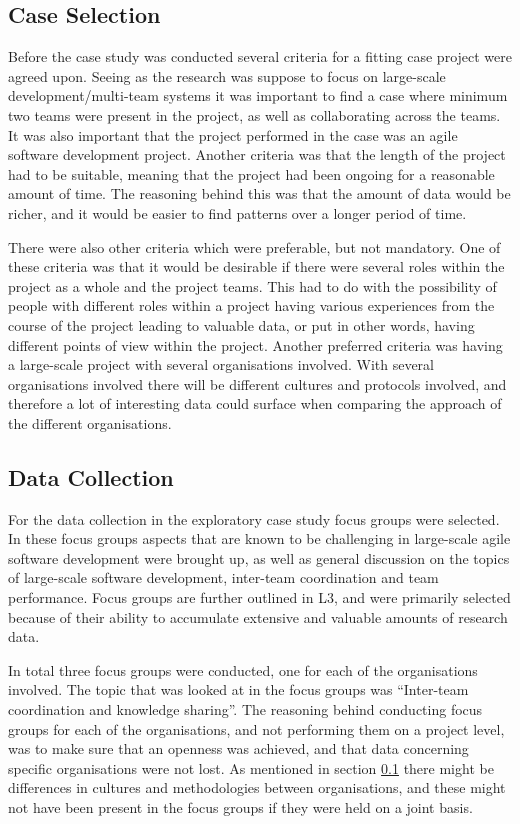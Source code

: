 \subsection{Case Selection}
\label{case_selection}

Before the case study was conducted several criteria for a fitting case project were agreed upon. Seeing as the research was suppose to focus on large-scale development/multi-team systems it was important to find a case where minimum two teams were present in the project, as well as collaborating across the teams. It was also important that the project performed in the case was an agile software development project. Another criteria was that the length of the project had to be suitable, meaning that the project had been ongoing for a reasonable amount of time. The reasoning behind this was that the amount of data would be richer, and it would be easier to find patterns over a longer period of time.

There were also other criteria which were preferable, but not mandatory. One of these criteria was that it would be desirable if there were several roles within the project as a whole and the project teams. This had to do with the possibility of people with different roles within a project having various experiences from the course of the project leading to valuable data, or put in other words, having different points of view within the project. Another preferred criteria was having a large-scale project with several organisations involved. With several organisations involved there will be different cultures and protocols involved, and therefore a lot of interesting data could surface when comparing the approach of the different organisations.

\subsection{Data Collection}

For the data collection in the exploratory case study focus groups were selected. In these focus groups aspects that are known to be challenging in large-scale agile software development were brought up, as well as general discussion on the topics of large-scale software development, inter-team coordination and team performance. Focus groups are further outlined in L3, and were primarily selected because of their ability to accumulate extensive and valuable amounts of research data.

In total three focus groups were conducted, one for each of the organisations involved. The topic that was looked at in the focus groups was ``Inter-team coordination and knowledge sharing''. The reasoning behind conducting focus groups for each of the organisations, and not performing them on a project level, was to make sure that an openness was achieved, and that data concerning specific organisations were not lost. As mentioned in section \ref{case_selection} there might be differences in cultures and methodologies between organisations, and these might not have been present in the focus groups if they were held on a joint basis.

